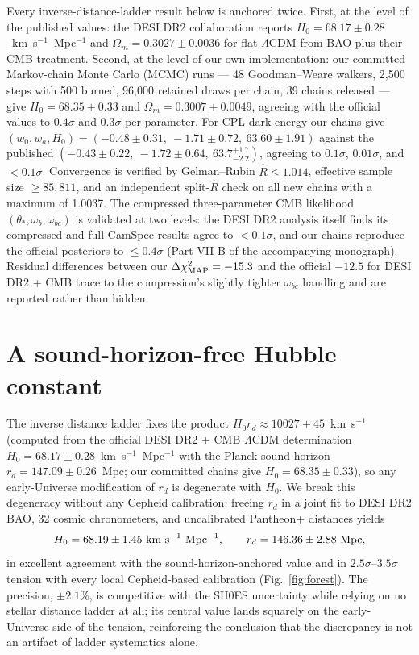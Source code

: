 \documentclass[11pt]{article}
\begin{document}
Every inverse-distance-ladder result below is anchored twice. First, at the level of the published values: the DESI DR2 collaboration reports $H_0 = 68.17 \pm 0.28$~km~s$^{-1}$~Mpc$^{-1}$ and $\Omega_m = 0.3027 \pm 0.0036$ for flat $\Lambda$CDM from BAO plus their CMB treatment. Second, at the level of our own implementation: our committed Markov-chain Monte Carlo (MCMC) runs --- 48 Goodman--Weare walkers, 2{,}500 steps with 500 burned, 96{,}000 retained draws per chain, 39 chains released --- give $H_0 = 68.35 \pm 0.33$ and $\Omega_m = 0.3007 \pm 0.0049$, agreeing with the official values to $0.4\sigma$ and $0.3\sigma$ per parameter. For CPL dark energy our chains give $(w_0, w_a, H_0) = (-0.48 \pm 0.31,\ -1.71 \pm 0.72,\ 63.60 \pm 1.91)$ against the published $(-0.43 \pm 0.22,\ -1.72 \pm 0.64,\ 63.7^{+1.7}_{-2.2})$, agreeing to $0.1\sigma$, $0.01\sigma$, and $<0.1\sigma$. Convergence is verified by Gelman--Rubin $\widehat{R} \le 1.014$, effective sample size $\ge 85{,}811$, and an independent split-$\widehat{R}$ check on all new chains with a maximum of 1.0037. The compressed three-parameter CMB likelihood $(\theta_*, \omega_b, \omega_{bc})$ is validated at two levels: the DESI DR2 analysis itself finds its compressed and full-CamSpec results agree to $<0.1\sigma$, and our chains reproduce the official posteriors to $\le 0.4\sigma$ (Part VII-B of the accompanying monograph). Residual differences between our $\Delta\chi^2_{\rm MAP} = -15.3$ and the official $-12.5$ for DESI DR2 + CMB trace to the compression's slightly tighter $\omega_{bc}$ handling and are reported rather than hidden.

\section*{A sound-horizon-free Hubble constant}

The inverse distance ladder fixes the product $H_0 r_d \approx 10027 \pm 45$~km~s$^{-1}$ (computed from the official DESI DR2 + CMB $\Lambda$CDM determination $H_0 = 68.17 \pm 0.28$~km~s$^{-1}$~Mpc$^{-1}$ with the Planck sound horizon $r_d = 147.09 \pm 0.26$~Mpc; our committed chains give $H_0 = 68.35 \pm 0.33$), so any early-Universe modification of $r_d$ is degenerate with $H_0$. We break this degeneracy without any Cepheid calibration: freeing $r_d$ in a joint fit to DESI DR2 BAO, 32 cosmic chronometers, and uncalibrated Pantheon+ distances yields
\begin{equation}
H_0 = 68.19 \pm 1.45~{\rm km~s}^{-1}~{\rm Mpc}^{-1}, \qquad r_d = 146.36 \pm 2.88~{\rm Mpc},
\end{equation}
in excellent agreement with the sound-horizon-anchored value and in $2.5\sigma$--$3.5\sigma$ tension with every local Cepheid-based calibration (Fig.~\ref{fig:forest}). The precision, $\pm 2.1\%$, is competitive with the SH0ES uncertainty while relying on no stellar distance ladder at all; its central value lands squarely on the early-Universe side of the tension, reinforcing the conclusion that the discrepancy is not an artifact of ladder systematics alone.
\end{document}
